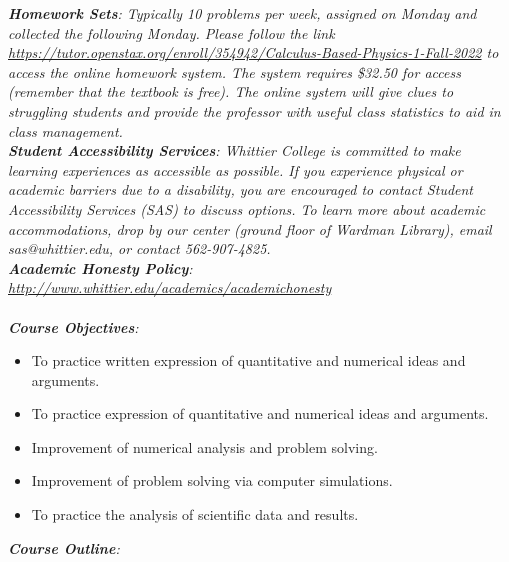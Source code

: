 \documentclass[10pt]{article}
\begin{document}
\noindent
\textit{\textbf{Homework Sets}: Typically 10 problems per week, assigned on Monday and collected the following Monday. Please follow the link \url{https://tutor.openstax.org/enroll/354942/Calculus-Based-Physics-1-Fall-2022} to access the online homework system. The system requires \$32.50 for access (remember that the textbook is free). The online system will give clues to struggling students and provide the professor with useful class statistics to aid in class management.} \\
\textit{\textbf{Student Accessibility Services}: Whittier College is committed to make learning experiences as accessible as possible. If you experience physical or academic barriers due to a disability, you are encouraged to contact Student Accessibility Services (SAS) to discuss options. To learn more about academic accommodations, drop by our center (ground floor of Wardman Library), email sas@whittier.edu, or contact 562-907-4825.} \\
\textit{\textbf{Academic Honesty Policy}: \url{http://www.whittier.edu/academics/academichonesty}} \\ \\
\textit{\textbf{Course Objectives}:}
\begin{itemize}
\item To practice written expression of quantitative and numerical ideas and arguments.
\item To practice expression of quantitative and numerical ideas and arguments.
\item Improvement of numerical analysis and problem solving.
\item Improvement of problem solving via computer simulations.
\item To practice the analysis of scientific data and results.
\end{itemize}
\clearpage
\textit{\textbf{Course Outline}:}
\end{document}
